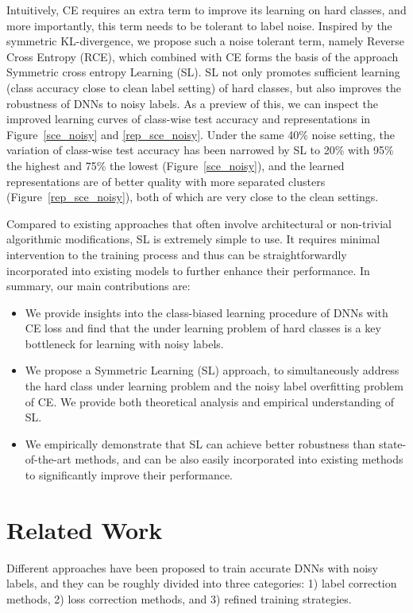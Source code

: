 \documentclass[10pt,twocolumn,letterpaper]{article}
\begin{document}
Intuitively, CE requires an extra term to improve its learning on hard classes, and more importantly, this term needs to be tolerant to label noise.
Inspired by the symmetric KL-divergence, we propose such a noise tolerant term, namely Reverse Cross Entropy (RCE), which combined with CE forms the basis of the approach Symmetric cross entropy Learning (SL). SL not only promotes sufficient learning (class accuracy close to clean label setting) of hard classes, but also improves the robustness of DNNs to noisy labels. As a preview of this, we can inspect the improved learning curves of class-wise test accuracy and representations in Figure~\ref{sce_noisy} and \ref{rep_sce_noisy}. Under the same 40\% noise setting, the variation of class-wise test accuracy has been narrowed by SL to 20\% with 95\% the highest and 75\% the lowest (Figure~\ref{sce_noisy}), and the learned representations are of better quality with more separated clusters (Figure~\ref{rep_sce_noisy}), both of which are very close to the clean settings. 

Compared to existing approaches that often involve architectural or non-trivial algorithmic modifications, SL is extremely simple to use. It requires minimal intervention to the training process and thus can be straightforwardly incorporated into existing models to further enhance their performance. In summary, our main contributions are:
\begin{itemize}
  \item  We provide insights into the class-biased learning procedure of DNNs with CE loss and find that the under learning problem of hard classes is a key bottleneck for learning with noisy labels.
  
  \item We propose a Symmetric Learning (SL) approach, to simultaneously address the hard class under learning problem and the noisy label overfitting problem of CE. We provide both theoretical analysis and empirical understanding of SL.
  
  \item We empirically demonstrate that SL can achieve better robustness than state-of-the-art methods, and can be also easily incorporated into existing methods to significantly improve their performance.
\end{itemize}

\section{Related Work}\label{sec:related_work}
Different approaches have been proposed to train accurate DNNs with noisy labels, and they can be roughly divided into three categories: 1) label correction methods, 2) loss correction methods, and 3) refined training strategies.
\end{document}
